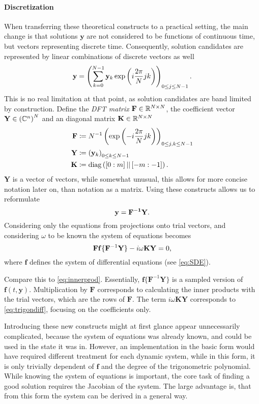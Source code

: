 \paragraph{Discretization} When transferring these theoretical constructs to a practical setting, the main change is that solutions $\mathbf{y}$ are not considered to be functions of continuous time, but vectors representing discrete time.
Consequently, solution candidates are represented by linear combinations of discrete vectors as well
	\[
		\mathbf{\mathbf{y}} = \left( \sum_{k=0}^{N-1} \mathbf{y}_k \exp\left(i \frac{2\pi}{N} j k\right) \right)_{0 \le j \le N-1} \text.
	\]
This is no real limitation at that point, as solution candidates are band limited by construction.
Define the \emph{DFT matrix} $\mathbf F \in \mathbb{R}^{N \times N}$, the coefficient vector $\mathbf Y \in \left(\mathbb{C}^n\right)^N$ and an diagonal matrix $\mathbf K \in \mathbb{R}^{N\times N}$
	\begin{align*}
		\mathbf{F} &\coloneqq N^{-1} \left( \exp\left(-i \frac{2\pi}{N} j k \right) \right)_{0 \le j,k \le N-1} \\
		\mathbf{Y} &\coloneqq \left(\mathbf{y}_k\right)_{0 \le k \le N-1} \\
		\mathbf K &\coloneqq \operatorname{diag}\left( [0:m]\, ||\, [-m:-1] \right) \text.
	\end{align*}
$\mathbf Y$ is a vector of vectors, while somewhat unusual, this allows for more concise notation later on, than notation as a matrix.
Using these constructs allows us to reformulate
	\[
			\mathbf{y} = \mathbf{F^{-1}} \mathbf{Y} \text.
	\]
Considering only the equations from projections onto trial vectors, and considering $\omega$ to be known the system of equations becomes %
	\[
		\mathbf{F} \mathbf{f}\{\mathbf F^{-1} \mathbf{Y}\} - i \omega \mathbf K \mathbf Y = 0\text,
	\]
where $\mathbf{f}$ defines the system of differential equations (see \autoref{eq:SDE}).

Compare this to \autoref{eq:innerprod}.
Essentially, $\mathbf{f}\{\mathbf F^{-1} \mathbf{Y}\}$ is a sampled version of $\mathbf f(t,\mathbf y)$.
Multiplication by $\mathbf F$ corresponds to calculating the inner products with the trial vectors, which are the rows of $\mathbf F$.
The term $i \omega \mathbf K \mathbf Y$ corresponds to \autoref{eq:trigondiff}, focusing on the coefficients only.

Introducing these new constructs might at first glance appear unnecessarily complicated, because the system of equations was already known, and could be used in the state it was in.
However, an implementation in the basic form would have required different treatment for each dynamic system, while in this form, it is only trivially dependent of $\mathbf f$ and the degree of the trigonometric polynomial.
While knowing the system of equations is important, the core task of finding a good solution requires the Jacobian of the system.
The large advantage is, that from this form the system can be derived in a general way.

